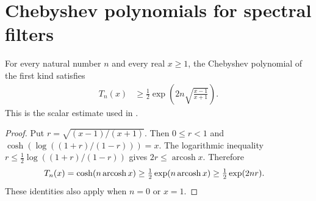 \section{Chebyshev polynomials for spectral filters}

\begin{theorem}
    \label{thm:chebyshev_half_exp_sqrt}
    \leanok
    For every natural number $n$ and every real $x\ge1$, the Chebyshev
    polynomial of the first kind satisfies
    \begin{align}
        T_n(x) & \ge\frac12\exp\left(2n\sqrt{\frac{x-1}{x+1}}\right).
        \label{eq:chebyshev_half_exp_sqrt}
    \end{align}
    This is the scalar estimate used in
    \cite{Arad2013AreaLaw,Arad2016RigorousRG}.
\end{theorem}
\begin{proof}\leanok
    Put $r=\sqrt{(x-1)/(x+1)}$. Then $0\le r<1$ and
    $\cosh(\log((1+r)/(1-r)))=x$. The logarithmic inequality
    $r\le\tfrac12\log((1+r)/(1-r))$ gives $2r\le\operatorname{arcosh}x$.
    Therefore
    \begin{align}
        T_n(x) & =\cosh(n\operatorname{arcosh}x)
        \ge\tfrac12\exp(n\operatorname{arcosh}x)
        \ge\tfrac12\exp(2nr).\notag
    \end{align}
    These identities also apply when $n=0$ or $x=1$.
\end{proof}


